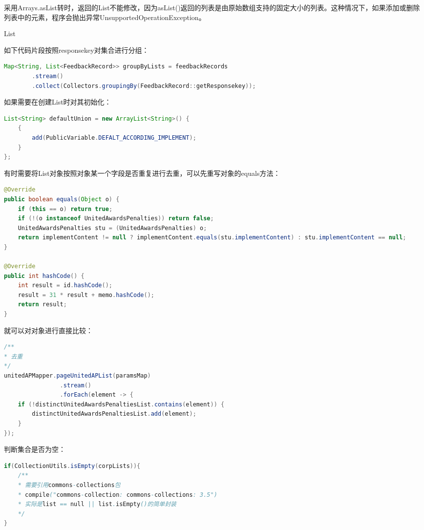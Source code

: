 \documentclass[12pt]{book}
\makeatletter
\numberwithin{dummy}{section}
\theoremstyle{ocrenumbox}
\theoremstyle{blacknumex}
\theoremstyle{blacknumbox}
\theoremstyle{ocrenum}
\renewcommand\paragraph{\@startsection{paragraph}{4}{\z@}
	{-2ex \@plus-.2ex \@minus .2ex}
	{.1ex}
	{\normalfont\small\sffamily\bfseries}}
\newlength\esp
\makeatother
\begin{document}
采用Arrays.asList转时，返回的List不能修改，因为asList()返回的列表是由原始数组支持的固定大小的列表。这种情况下，如果添加或删除列表中的元素，程序会抛出异常UnsupportedOperationException。

\paragraph{List}

如下代码片段按照responsekey对集合进行分组：

\begin{lstlisting}[language=Java]
Map<String, List<FeedbackRecord>> groupByLists = feedbackRecords
		.stream()
		.collect(Collectors.groupingBy(FeedbackRecord::getResponsekey));
\end{lstlisting}

如果需要在创建List时对其初始化：

\begin{lstlisting}[language=Java]
List<String> defaultUnion = new ArrayList<String>() {
	{
		add(PublicVariable.DEFALT_ACCORDING_IMPLEMENT);
	}
};
\end{lstlisting}

有时需要将List对象按照对象某一个字段是否重复进行去重，可以先重写对象的equals方法：


\begin{lstlisting}[language=Java]
@Override
public boolean equals(Object o) {
	if (this == o) return true;
	if (!(o instanceof UnitedAwardsPenalties)) return false;
	UnitedAwardsPenalties stu = (UnitedAwardsPenalties) o;
	return implementContent != null ? implementContent.equals(stu.implementContent) : stu.implementContent == null;
}

@Override
public int hashCode() {
	int result = id.hashCode();
	result = 31 * result + memo.hashCode();
	return result;
}
\end{lstlisting}

就可以对对象进行直接比较：

\begin{lstlisting}[language=Java]
/**
* 去重
*/
unitedAPMapper.pageUnitedAPList(paramsMap)
				.stream()
				.forEach(element -> {
	if (!distinctUnitedAwardsPenaltiesList.contains(element)) {
		distinctUnitedAwardsPenaltiesList.add(element);
	}
});
\end{lstlisting}

判断集合是否为空：

\begin{lstlisting}[language=Java]
if(CollectionUtils.isEmpty(corpLists)){
	/**
	* 需要引用commons-collections包
	* compile("commons-collection: commons-collections: 3.5")
	* 实际是list == null || list.isEmpty()的简单封装
	*/
}
\end{lstlisting}
\end{document}
